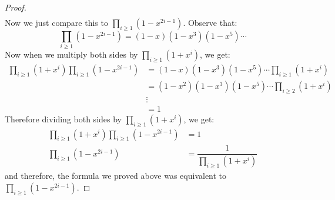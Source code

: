 \documentclass{article}
\begin{document}
\begin{itemize}
\begin{proof}
\begin{align*}
                    \end{align*}
                Now we just compare this to $\prod_{i \geq 1}(1 - x^{2i - 1})$. Observe that:
                    \begin{equation*}
                        \prod_{i \geq 1}(1 - x^{2i - 1}) = (1 - x)(1 - x^{3})(1 - x^{5}) \cdots 
                    \end{equation*}
                Now when we multiply both sides by $\prod_{i \geq 1}(1 + x^{i})$, we get:
                    \begin{align*}
                         \prod_{i \geq 1}(1 + x^{i})\prod_{i \geq 1}(1 - x^{2i - 1}) &=       (1 - x)(1 - x^{3})(1 - x^{5}) \cdots \prod_{i \geq 1}(1 + x^{i})     \\
                                                                                     &=       (1 - x^{2})(1 - x^{3})(1 - x^{5}) \cdots \prod_{i \geq 2}(1 + x^{i}) \\
                                                                                     &\vdots                                                                       \\
                                                                                     &=       1                                                                      
                     \end{align*}
                Therefore dividing both sides by $\prod_{i \geq 1}(1 + x^{i})$, we get:
                    \begin{align*}
                         \prod_{i \geq 1}(1 + x^{i})\prod_{i \geq 1}(1 - x^{2i - 1}) &= 1                                      \\
                         \prod_{i \geq 1}(1 - x^{2i - 1})                            &= \dfrac{1}{\prod_{i \geq 1}(1 + x^{i})}   
                    \end{align*}
                and therefore, the formula we proved above was equivalent to $\prod_{i \geq 1}(1 - x^{2i - 1})$.
            \end{proof}


\end{itemize}
\end{document}
